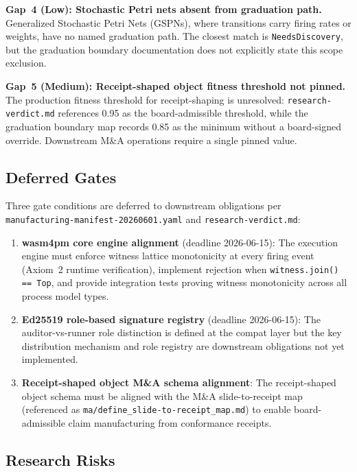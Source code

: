 \textbf{Gap~4 (Low): Stochastic Petri nets absent from graduation path.}
Generalized Stochastic Petri Nets (GSPNs), where transitions carry firing rates or
weights, have no named graduation path. The closest match is
\texttt{NeedsDiscovery}, but the graduation boundary documentation does not
explicitly state this scope exclusion.

\textbf{Gap~5 (Medium): Receipt-shaped object fitness threshold not pinned.}
The production fitness threshold for receipt-shaping is unresolved: \texttt{research-verdict.md}
references 0.95 as the board-admissible threshold, while the graduation boundary map
records 0.85 as the minimum without a board-signed override. Downstream M\&A operations
require a single pinned value.

\subsection{Deferred Gates}
\label{sec:sources-wasm4pm-compat-openquestions-deferred}

Three gate conditions are deferred to downstream obligations per
\texttt{manufacturing-manifest-20260601.yaml} and \texttt{research-verdict.md}:

\begin{enumerate}
  \item \textbf{wasm4pm core engine alignment} (deadline 2026-06-15): The execution engine
    must enforce witness lattice monotonicity at every firing event (Axiom~2 runtime
    verification), implement rejection when \texttt{witness.join() == Top}, and provide
    integration tests proving witness monotonicity across all process model types.
  \item \textbf{Ed25519 role-based signature registry} (deadline 2026-06-15): The auditor-vs-runner
    role distinction is defined at the compat layer but the key distribution mechanism and
    role registry are downstream obligations not yet implemented.
  \item \textbf{Receipt-shaped object M\&A schema alignment}: The receipt-shaped object
    schema must be aligned with the M\&A slide-to-receipt map (referenced as
    \texttt{ma/define\_slide-to-receipt\_map.md}) to enable board-admissible claim
    manufacturing from conformance receipts.
\end{enumerate}

\subsection{Research Risks}
\label{sec:sources-wasm4pm-compat-openquestions-risks}

